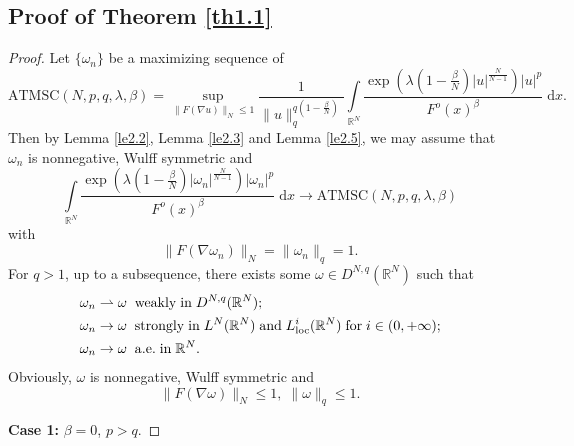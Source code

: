 \documentclass[11pt]{article}
\theoremstyle{plain}
\numberwithin{equation}{section}
\newcommand{\R}{\mathbb{R}}
\begin{document}
\subsection{Proof of Theorem \ref{th1.1}}
\begin{proof}
Let $\{\omega_{n}\}$ be a maximizing sequence of
$$
\mathrm{ATMSC}(N,p,q,\lambda,\beta)=\sup\limits_{\|F(\nabla u)\|_{N}\leq 1}\frac{1}{\|u\|_{q}^{q(1-\frac{\beta}{N})}}\int\limits_{\R^{N}}\frac{\exp(\lambda(1-\frac{\beta}{N})\lvert u\rvert^{\frac{N}{N-1}})\lvert u\rvert^{p}}{F^{o}(x)^{\beta}}\;\mathrm{d}x.
$$
Then by Lemma \ref{le2.2}, Lemma \ref{le2.3} and Lemma \ref{le2.5}, we may assume that $\omega_{n}$ is nonnegative, Wulff symmetric and
$$
\int\limits_{\R^{N}}\frac{\exp(\lambda(1-\frac{\beta}{N})\lvert \omega_{n}\rvert^{\frac{N}{N-1}})\lvert \omega_{n}\rvert^{p}}{F^{o}(x)^{\beta}}\;\mathrm{d}x\rightarrow\mathrm{ATMSC}(N,p,q,\lambda,\beta)
$$
with
$$
\|F(\nabla\omega_{n})\|_{N}=\|\omega_{n}\|_{q}=1.
$$
For $q>1$, up to a subsequence, there exists some $\omega\in D^{N,q}(\R^{N})$ such that
\begin{align}
    &\omega_{n}\rightharpoonup \omega\;\;\mathrm{weakly}\;\mathrm{in}\;D^{N,q}(\R^{N})\textup{;}\notag\\
    &\omega_{n}\rightarrow \omega\;\;\mathrm{strongly}\;\mathrm{in}\;L^{N}(\R^{N})\;\mathrm{and}\;L_{\mathrm{loc}}^{i}(\R^{N})\;\mathrm{for}\;i\in(0,+\infty)\textup{;}\notag\\
    &\omega_{n}\rightarrow \omega\;\;\mathrm{a.e.}\;\mathrm{in}\;\R^{N}.\notag
\end{align}
Obviously, $\omega$ is nonnegative, Wulff symmetric and
$$
\|F(\nabla\omega)\|_{N}\leq1,\;\|\omega\|_{q}\leq1.
$$

{\bfseries Case 1:} $\beta=0$, $p>q$.


\end{proof}
\end{document}
